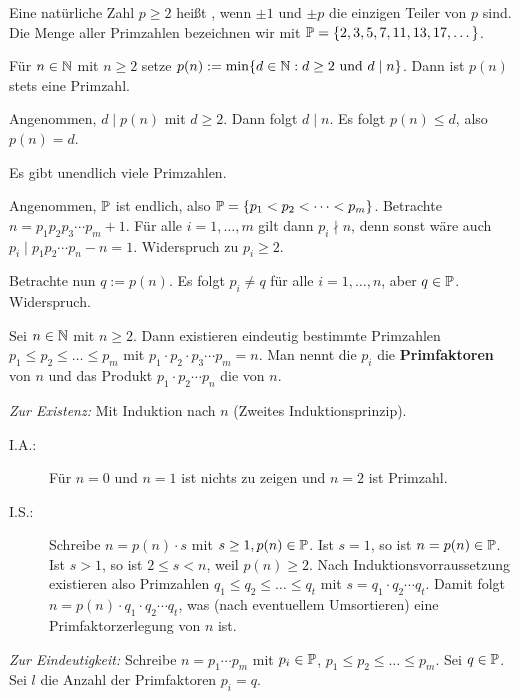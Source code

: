 	\begin{definition}[Primzahl]
		Eine natürliche Zahl $p \geq 2$ heißt , wenn $\pm 1$ und $\pm p$ die einzigen Teiler von $p$ sind. \marginnote{[9]}
		Die Menge aller Primzahlen bezeichnen wir mit $\mathbb{P} = \{2,3,5,7,11,13,17,\dots\}$.
	\end{definition}

	\begin{lemma}
		Für $n \in \mathbb{N}$ mit $n \geq 2$ setze $p(n) := \min\{d \in \mathbb{N} : d \geq 2 \text{ und } d \mid n\}$.
		Dann ist $p(n)$ stets eine Primzahl.
	\end{lemma}

	\begin{beweis}
		Angenommen, $d \mid p(n)$ mit $d \geq 2$.
		Dann folgt $d \mid n$.
		Es folgt $p(n) \leq d$, also $p(n) = d$.
	\end{beweis}

	\begin{satz}[Euklid]
		Es gibt unendlich viele Primzahlen. \marginnote{[10]}
	\end{satz}

	\begin{beweis}
		Angenommen, $\mathbb{P}$ ist endlich, also $\mathbb{P}= \{p_1 < p_2 < \dots < p_m\}$.
		Betrachte $n = p_1p_2p_3 \cdots p_m + 1$.
		Für alle $i = 1, \dots, m$ gilt dann $p_i \nmid n$, denn sonst wäre auch $p_i \mid p_1p_2\cdots p_n - n = 1$.
		Widerspruch zu $p_i \geq 2$.
		
		Betrachte nun $q := p(n)$.
		Es folgt $p_i \neq q$ für alle $i=1,\dots,n$, aber $q \in \mathbb{P}$.
		Widerspruch.
	\end{beweis}

	\begin{thm}
		Sei $n \in \mathbb{N}$ mit $n \geq 2$. \marginnote{[11]}
		Dann existieren eindeutig bestimmte Primzahlen $p_1 \leq p_2 \leq \dots \leq p_m$ mit $p_1 \cdot p_2 \cdot p_3 \cdots p_m = n$.
		Man nennt die $p_i$ die \textbf{Primfaktoren} von $n$ und das Produkt $p_1 \cdot p_2 \cdots p_n$ die  von $n$.
	\end{thm}

	\begin{beweis}
		\textit{Zur Existenz:} Mit Induktion nach $n$ (Zweites Induktionsprinzip).
		\begin{description}
			\item[I.A.:] Für $n=0$ und $n=1$ ist nichts zu zeigen und $n=2$ ist Primzahl.
			\item[I.S.:] Schreibe $n = p(n) \cdot s$ mit $s \geq 1, p(n) \in \mathbb{P}$.
			Ist $s = 1$, so ist $n = p(n) \in \mathbb{P}$.
			Ist $s > 1$, so ist $2 \leq s < n$, weil $p(n) \geq 2$.
			Nach Induktionsvorraussetzung existieren also Primzahlen $q_1 \leq q_2 \leq \dots \leq q_t$ mit $s = q_1 \cdot q_2 \cdots q_t$.
			Damit folgt	$n = p(n) \cdot q_1 \cdot q_2 \cdots q_t$, was (nach eventuellem Umsortieren) eine Primfaktorzerlegung von $n$ ist.
		\end{description}
	
		\textit{Zur Eindeutigkeit:} Schreibe $n = p_1 \cdots p_m$ mit $p_i \in \mathbb{P}$, $p_1 \leq p_2 \leq \dots \leq p_m$.
		Sei $q \in \mathbb{P}$.
		Sei $l$ die Anzahl der Primfaktoren $p_i = q$.
	\end{beweis}
\cleardoubleoddemptypage